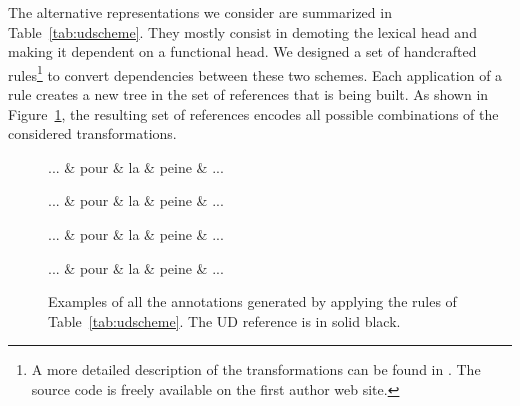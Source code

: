 \documentclass[11pt,letterpaper]{article}
\begin{document}
The alternative representations we consider are summarized in
Table~\ref{tab:udscheme}. They mostly consist in demoting the lexical
head and making it dependent on a functional head.  We designed a set
of handcrafted rules\footnote{A more detailed description of the
  transformations can be found in \cite{wisniewski17}. The source code
  is freely available on the first author web site.} to convert
dependencies between these two schemes.  Each application of a rule
creates a new tree in the set of references that is being built. As
shown in Figure~\ref{fig:ex_transfo}, the resulting set of
references encodes all possible combinations of the considered
transformations.

\begin{figure}[htbp]
  \centering
  \begin{dependency}[theme=night]
    \begin{deptext}
      ... \& pour \& la \& peine \& ... \\
    \end{deptext}
  \end{dependency}
  \begin{dependency}
    \begin{deptext}
      ... \& pour \& la \& peine \& ... \\
    \end{deptext}
  \end{dependency}
  \begin{dependency}
    \begin{deptext}
      ... \& pour \& la \& peine \& ... \\
    \end{deptext}
  \end{dependency}
  \begin{dependency}
    \begin{deptext}
      ... \& pour \& la \& peine \& ... \\
    \end{deptext}
  \end{dependency}
  \caption{Examples of all the annotations generated by applying the
    rules of Table~\ref{tab:udscheme}. The UD reference is
    in solid black.\label{fig:ex_transfo}}
\end{figure}
\end{document}
